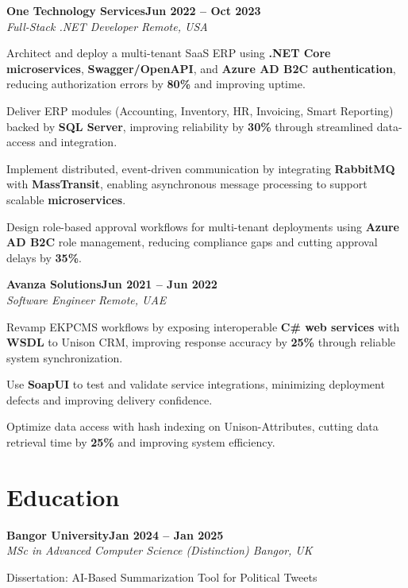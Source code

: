 \documentclass[letterpaper,10pt]{article}
\newcommand{\headingBf}[2]{
  \hspace{10pt}\textbf{#1}\hfill\textbf{#2}\\
}
\newcommand{\headingIt}[2]{
  \hspace{10pt}\textit{#1}\hfill\textit{#2}\\
}
\newenvironment{resume_list}{
  \vspace{-7pt}
  \begin{itemize}[itemsep=-2px, parsep=1pt, leftmargin=30pt]
}{
  \end{itemize}
}
\begin{document}
\headingBf{One Technology Services}{Jun 2022 -- Oct 2023}
\headingIt{Full-Stack .NET Developer \hfill Remote, USA}{}
\begin{resume_list}
    \item Architect and deploy a multi-tenant SaaS ERP using \textbf{.NET Core microservices}, \textbf{Swagger/OpenAPI}, and \textbf{Azure AD B2C authentication}, reducing authorization errors by \textbf{80\%} and improving uptime.
    \item Deliver ERP modules (Accounting, Inventory, HR, Invoicing, Smart Reporting) backed by \textbf{SQL Server}, improving reliability by \textbf{30\%} through streamlined data-access and integration.
    \item Implement distributed, event-driven communication by integrating \textbf{RabbitMQ} with \textbf{MassTransit}, enabling asynchronous message processing to support scalable \textbf{microservices}.
    \item Design role-based approval workflows for multi-tenant deployments using \textbf{Azure AD B2C} role management, reducing compliance gaps and cutting approval delays by \textbf{35\%}.
\end{resume_list}

\headingBf{Avanza Solutions}{Jun 2021 -- Jun 2022}
\headingIt{Software Engineer \hfill Remote, UAE}{}
\begin{resume_list}
    \item Revamp EKPCMS workflows by exposing interoperable \textbf{C\# web services} with \textbf{WSDL} to Unison CRM, improving response accuracy by \textbf{25\%} through reliable system synchronization.
    \item Use \textbf{SoapUI} to test and validate service integrations, minimizing deployment defects and improving delivery confidence.
    \item Optimize data access with hash indexing on Unison-Attributes, cutting data retrieval time by \textbf{25\%} and improving system efficiency.
\end{resume_list}

\section{Education}

\headingBf{Bangor University}{Jan 2024 -- Jan 2025}
\headingIt{MSc in Advanced Computer Science (Distinction) \hfill Bangor, UK}{}
\begin{resume_list}
    \item Dissertation: AI-Based Summarization Tool for Political Tweets
\end{resume_list}
\end{document}
